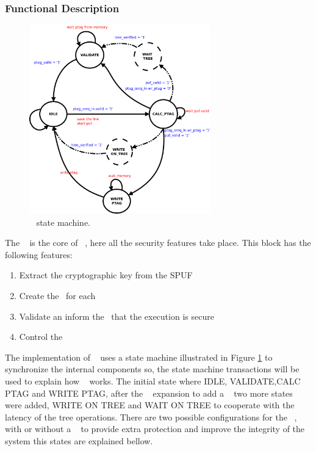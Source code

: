 \subsubsection{Functional Description}

\begin{figure}[!ht]
    \centering
    \includegraphics[width=0.70\textwidth]{figures/pdf/sec_engine_sm.pdf}
    \caption{\seceng~ state  machine. }
    \label{fig:sesm}
\end{figure}

The \seceng~ is the core of \cshia~, here all the security features take place. This block has the following features: 
\begin{enumerate}
    \item Extract the cryptographic key from the SPUF
    \item Create the \ptags~for each \sline
    \item Validate \ptags an inform the \handler~that the execution is secure
    \item Control the \ptagmem~ 
\end{enumerate}
The implementation of \seceng~ uses a state machine illustrated in Figure \ref{fig:sesm} to synchronize the internal components so,  the  state machine transactions will be used to explain how \seceng~ works. The initial state where IDLE, VALIDATE,CALC PTAG  and WRITE PTAG, after the \cshia~ expansion to add a \mt~  two more states were added, WRITE ON TREE and WAIT ON TREE  to cooperate with the  latency of the tree  operations. There are two possible configurations for the \seceng~, with or without a \mt~ to provide extra protection and improve the integrity of the system this states are explained bellow. 


